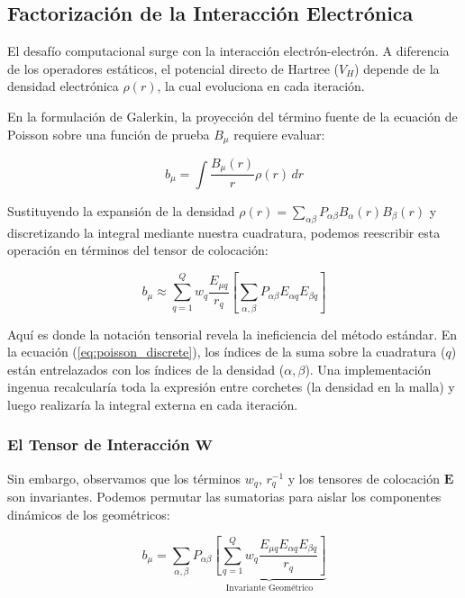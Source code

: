 \documentclass[12pt, a4paper, oneside, spanish]{article}
\begin{document}
\subsection{Factorización de la Interacción Electrónica}

El desafío computacional surge con la interacción electrón-electrón. A diferencia de los operadores estáticos, el potencial directo de Hartree (\( V_H \)) depende de la densidad electrónica \( \rho(r) \), la cual evoluciona en cada iteración.

En la formulación de Galerkin, la proyección del término fuente de la ecuación de Poisson sobre una función de prueba \( B_\mu \) requiere evaluar:

\begin{equation}
\label{eq:poisson_continuous}
b_\mu = \int \frac{B_\mu(r)}{r} \rho(r) \, dr
\end{equation}

Sustituyendo la expansión de la densidad \( \rho(r) = \sum_{\alpha \beta} P_{\alpha \beta} B_\alpha(r) B_\beta(r) \) y discretizando la integral mediante nuestra cuadratura, podemos reescribir esta operación en términos del tensor de colocación:

\begin{equation}
\label{eq:poisson_discrete}
b_\mu \approx \sum_{q=1}^Q w_q \frac{E_{\mu q}}{r_q} \left[ \sum_{\alpha, \beta} P_{\alpha \beta} E_{\alpha q} E_{\beta q} \right]
\end{equation}

Aquí es donde la notación tensorial revela la ineficiencia del método estándar. En la ecuación (\ref{eq:poisson_discrete}), los índices de la suma sobre la cuadratura (\( q \)) están entrelazados con los índices de la densidad (\( \alpha, \beta \)). Una implementación ingenua recalcularía toda la expresión entre corchetes (la densidad en la malla) y luego realizaría la integral externa en cada iteración.

\subsubsection{El Tensor de Interacción \( \mathbf{W} \)}

Sin embargo, observamos que los términos \( w_q \), \( r_q^{-1} \) y los tensores de colocación \( \bm{E} \) son invariantes. Podemos permutar las sumatorias para aislar los componentes dinámicos de los geométricos:

\begin{equation}
b_\mu = \sum_{\alpha, \beta} P_{\alpha \beta} \underbrace{ \left[ \sum_{q=1}^Q w_q \frac{E_{\mu q} E_{\alpha q} E_{\beta q}}{r_q} \right] }_{\text{Invariante Geométrico}}
\end{equation}
\end{document}
